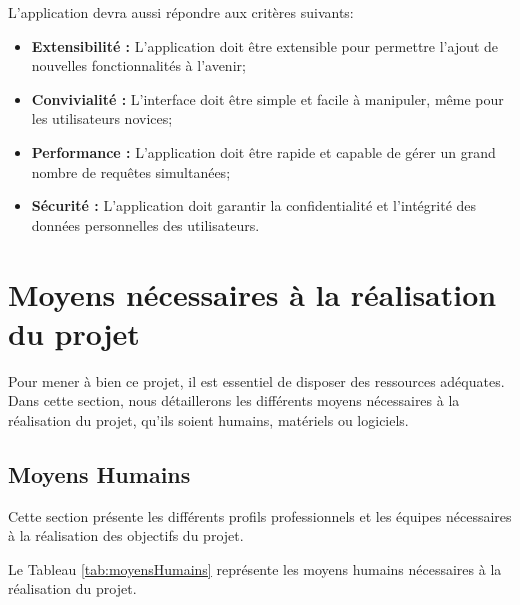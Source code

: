 \documentclass[12pt]{report}
\begin{document}
						L'application devra aussi répondre aux critères suivants:

						\begin{itemize}
							\item \textbf{Extensibilité :}  L'application doit être extensible pour permettre l'ajout de nouvelles fonctionnalités à l'avenir;
							\item \textbf{Convivialité :} L'interface doit être simple et facile à manipuler, même pour les utilisateurs novices;
							\item \textbf{Performance :} L'application doit être rapide et capable de gérer un grand nombre de requêtes simultanées;
							\item \textbf{Sécurité :} L'application doit garantir la confidentialité et l'intégrité des données personnelles des utilisateurs.
						\end{itemize}
								
				\section{Moyens nécessaires à la réalisation du projet}

				\hspace{15pt} Pour mener à bien ce projet, il est essentiel de disposer des ressources adéquates. Dans cette section, nous détaillerons les différents moyens nécessaires à la réalisation du projet, qu'ils soient humains, matériels ou logiciels.

				\subsection{Moyens Humains}

				\hspace{15pt} Cette section présente les différents profils professionnels et les équipes nécessaires à la réalisation des objectifs du projet.				

				Le Tableau \ref{tab:moyensHumains} représente les moyens humains nécessaires à la réalisation du projet.
\end{document}
